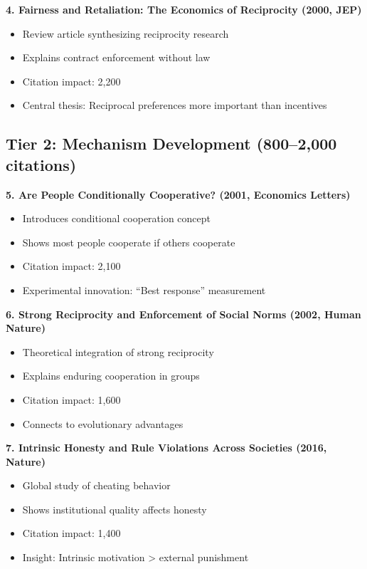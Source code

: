 \documentclass[11pt]{article}
\begin{document}
\textbf{4. Fairness and Retaliation: The Economics of Reciprocity (2000, JEP)}
\begin{itemize}
    \item Review article synthesizing reciprocity research
    \item Explains contract enforcement without law
    \item Citation impact: 2,200
    \item Central thesis: Reciprocal preferences more important than incentives
\end{itemize}

\subsection*{Tier 2: Mechanism Development (800–2,000 citations)}

\textbf{5. Are People Conditionally Cooperative? (2001, Economics Letters)}
\begin{itemize}
    \item Introduces conditional cooperation concept
    \item Shows most people cooperate if others cooperate
    \item Citation impact: 2,100
    \item Experimental innovation: ``Best response'' measurement
\end{itemize}

\textbf{6. Strong Reciprocity and Enforcement of Social Norms (2002, Human Nature)}
\begin{itemize}
    \item Theoretical integration of strong reciprocity
    \item Explains enduring cooperation in groups
    \item Citation impact: 1,600
    \item Connects to evolutionary advantages
\end{itemize}

\textbf{7. Intrinsic Honesty and Rule Violations Across Societies (2016, Nature)}
\begin{itemize}
    \item Global study of cheating behavior
    \item Shows institutional quality affects honesty
    \item Citation impact: 1,400
    \item Insight: Intrinsic motivation > external punishment
\end{itemize}
\end{document}
